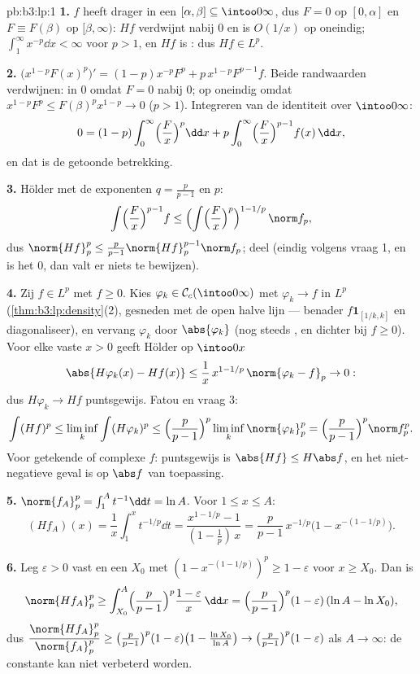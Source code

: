 \begin{solution}{pb:b3:lp:1}
\textbf{1.} $f$ heeft drager in een $[\alpha, \beta] \subseteq
\intoo0\infty$, dus $F = 0$ op $[0, \alpha]$ en $F \equiv
F(\beta)$ op $[\beta, \infty)$: $Hf$ verdwijnt nabij $0$ en is
$O(1/x)$ op oneindig; $\int_1^\infty x^{-p}\dd x < \infty$ voor
$p > 1$, en $Hf$ is : dus $Hf \in L^p$.

\textbf{2.} $\bigl(x^{1-p}F(x)^p\bigr)' = (1-p)x^{-p}F^p +
p\,x^{1-p}F^{p-1}f$. Beide randwaarden verdwijnen: in $0$ omdat
$F = 0$ nabij $0$; op oneindig omdat $x^{1-p}F^p \leq
F(\beta)^p x^{1-p} \to 0$ ($p > 1$). Integreren van de identiteit
over $\intoo0\infty$:
\[
0 = (1 - p)\int_0^\infty\Bigl(\frac Fx\Bigr)^p\dd x
+ p\int_0^\infty\Bigl(\frac Fx\Bigr)^{p-1}f(x)\,\dd x,
\]
en dat is de getoonde betrekking.

\textbf{3.} Hölder met de exponenten $q = \frac p{p-1}$ en $p$:
\[
\int\Bigl(\frac Fx\Bigr)^{p-1}f
\leq \Bigl(\int\Bigl(\frac
Fx\Bigr)^{p}\Bigr)^{1 - 1/p}\,\norm f_p ,
\]
dus $\norm{Hf}_p^p \leq \frac p{p-1}\norm{Hf}_p^{p-1}\norm f_p$;
deel (eindig volgens vraag 1, en is het $0$, dan valt er niets te
bewijzen).

\textbf{4.} Zij $f \in L^p$ met $f \geq 0$. Kies $\varphi_k \in
\mathcal C_c(\intoo0\infty)$ met $\varphi_k \to f$ in $L^p$
(\cref{thm:b3:lp:density}(2), gesneden met de open halve lijn ---
benader $f\mathbf 1_{[1/k, k]}$ en diagonaliseer), en vervang
$\varphi_k$ door $\abs{\varphi_k}$ (nog steeds , en dichter
bij $f \geq 0$). Voor elke vaste $x > 0$ geeft Hölder op
$\intoo0x$
\[
\abs{H\varphi_k(x) - Hf(x)} \leq
\frac1x\,x^{1 - 1/p}\,\norm{\varphi_k - f}_p \to 0 :
\]
dus $H\varphi_k \to Hf$ puntsgewijs. Fatou en vraag 3:
\[
\int (Hf)^p \leq \liminf_k\int(H\varphi_k)^p
\leq \Bigl(\frac p{p-1}\Bigr)^p\liminf_k\norm{\varphi_k}_p^p
= \Bigl(\frac p{p-1}\Bigr)^p\norm f_p^p .
\]
Voor getekende of complexe $f$: puntsgewijs is $\abs{Hf} \leq
H\abs f$, en het niet-negatieve geval is op $\abs f$ van
toepassing.

\textbf{5.} $\norm{f_A}_p^p = \int_1^A t^{-1}\dd t = \ln A$. Voor
$1 \leq x \leq A$:
\[
(Hf_A)(x) = \frac1x\int_1^x t^{-1/p}\dd t
= \frac{x^{1 - 1/p} - 1}{(1 - \tfrac1p)\,x}
= \frac p{p-1}\,x^{-1/p}\bigl(1 - x^{-(1 - 1/p)}\bigr).
\]

\textbf{6.} Leg $\varepsilon > 0$ vast en een $X_0$ met $(1 -
x^{-(1-1/p)})^p \geq 1 - \varepsilon$ voor $x \geq X_0$. Dan is
\[
\norm{Hf_A}_p^p \geq \int_{X_0}^A\Bigl(\frac
p{p-1}\Bigr)^p\frac{1 - \varepsilon}{x}\,\dd x
= \Bigl(\frac p{p-1}\Bigr)^p(1 - \varepsilon)\,(\ln A - \ln
X_0),
\]
dus $\dfrac{\norm{Hf_A}_p^p}{\norm{f_A}_p^p} \geq \bigl(\frac
p{p-1}\bigr)^p(1 - \varepsilon)\bigl(1 - \frac{\ln X_0}{\ln
A}\bigr) \to \bigl(\frac p{p-1}\bigr)^p(1 - \varepsilon)$ als $A
\to \infty$: de constante kan niet verbeterd worden.


\end{solution}
